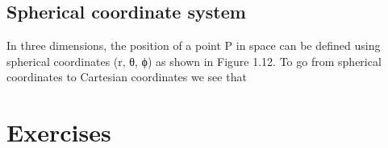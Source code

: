 
\subsection{Spherical coordinate system}
In three dimensions, the position of a point P in space can be defined using spherical coordinates (r, θ, ϕ) as shown in Figure 1.12. To go from spherical coordinates to Cartesian coordinates we see that



\section{Exercises}
\begin{ExerciseList}
\end{ExerciseList}
